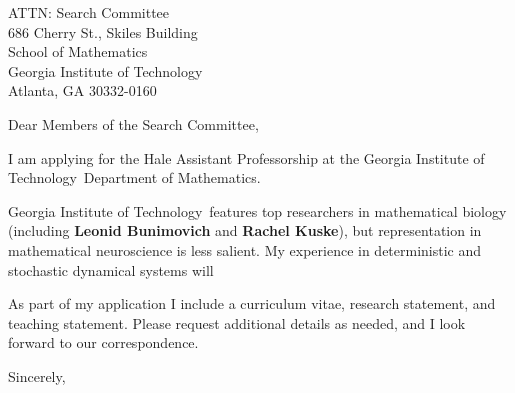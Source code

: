 \documentclass[11pt,a4paper]{letter}
\begin{document}

\def\School{Georgia Institute of Technology}

\begin{letter}
{ATTN: Search Committee\\
686 Cherry St., Skiles Building\\
School of Mathematics\\
Georgia Institute of Technology\\
Atlanta, GA 30332-0160
}


\opening{Dear Members of the Search Committee,}

I am applying for the Hale Assistant Professorship at the \School~Department of Mathematics. 



\School~features top researchers in mathematical biology (including \textbf{Leonid Bunimovich} and \textbf{Rachel Kuske}), but representation in mathematical neuroscience is less salient. My experience in deterministic and stochastic dynamical systems will 



As part of my application I include a curriculum vitae, research statement, and teaching statement. Please request additional details as needed, and I look forward to our correspondence.

\closing{Sincerely,}
\end{letter}
\end{document}
